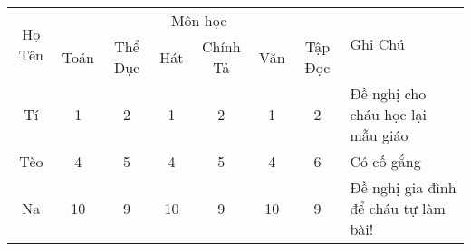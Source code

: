 \documentclass[a4paper]{article}
\begin{document}
  \begin{table}
    \begin{tabular}{|c|cccccc|l|}
      \hline
      \multirow{2}{*}{Họ Tên} & \multicolumn{6}{c|}{Môn học} & \multirow{2}{*}{Ghi Chú} \\
      \cline{2-7} & Toán & Thể Dục & Hát & Chính Tả & Văn & Tập Đọc & \\
      \hline
      Tí  & 1   & 2   & 1   & 2   & 1   & 2   & Đề nghị cho cháu học lại mẫu giáo \\
      Tèo & 4   & 5   & 4   & 5   & 4   & 6   & Có cố gắng \\
      Na  & 10  & 9   & 10  & 9   & 10  & 9   & Đề nghị gia đình để cháu tự làm bài! \\
      \hline
    \end{tabular}%
  \end{table}%
\end{document}
